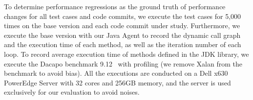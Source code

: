 To determine performance regressions as the ground truth of performance changes for all test cases and code commits, we execute  the test cases for 5,000 times on the base version and each code commit under study. Furthermore, we execute the base version with our Java Agent to record the dynamic call graph and the execution time of each method, as well as the iteration number of each loop. To record average execution time of methods defined in the JDK library, we execute the Dacapo benchmark 9.12~\cite{dacapo} with profiling (we remove Xalan from the benchmark to avoid bias). All the executions are conducted on a Dell x630 PowerEdge Server with 32 cores and 256GB memory, and the server is used exclusively for our evaluation to avoid noises. 










